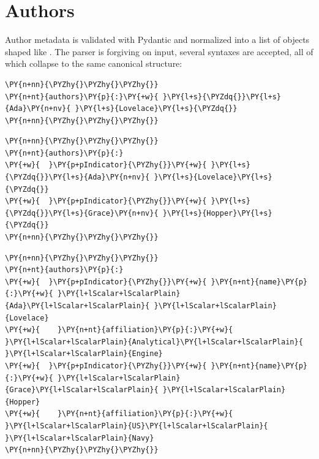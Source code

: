 \documentclass[a4paper,twoside]{article}
\begin{document}
\section{Authors}
Author metadata is validated with Pydantic and normalized into a list of objects shaped like . The parser is forgiving on input, several syntaxes are accepted, all of which collapse to the same canonical structure:
\begin{tscode}[lang=yaml, engine=pygments]
\begin{Verbatim}[commandchars=\\\{\},breaklines, breakanywhere, commandchars=\\\{\}]
\PY{n+nn}{\PYZhy{}\PYZhy{}\PYZhy{}}
\PY{n+nt}{authors}\PY{p}{:}\PY{+w}{ }\PY{l+s}{\PYZdq{}}\PY{l+s}{Ada}\PY{n+nv}{ }\PY{l+s}{Lovelace}\PY{l+s}{\PYZdq{}}
\PY{n+nn}{\PYZhy{}\PYZhy{}\PYZhy{}}
\end{Verbatim}
\end{tscode}
\begin{tscode}[lang=yaml, engine=pygments]
\begin{Verbatim}[commandchars=\\\{\},breaklines, breakanywhere, commandchars=\\\{\}]
\PY{n+nn}{\PYZhy{}\PYZhy{}\PYZhy{}}
\PY{n+nt}{authors}\PY{p}{:}
\PY{+w}{  }\PY{p+pIndicator}{\PYZhy{}}\PY{+w}{ }\PY{l+s}{\PYZdq{}}\PY{l+s}{Ada}\PY{n+nv}{ }\PY{l+s}{Lovelace}\PY{l+s}{\PYZdq{}}
\PY{+w}{  }\PY{p+pIndicator}{\PYZhy{}}\PY{+w}{ }\PY{l+s}{\PYZdq{}}\PY{l+s}{Grace}\PY{n+nv}{ }\PY{l+s}{Hopper}\PY{l+s}{\PYZdq{}}
\PY{n+nn}{\PYZhy{}\PYZhy{}\PYZhy{}}
\end{Verbatim}
\end{tscode}
\begin{tscode}[lang=yaml, engine=pygments]
\begin{Verbatim}[commandchars=\\\{\},breaklines, breakanywhere, commandchars=\\\{\}]
\PY{n+nn}{\PYZhy{}\PYZhy{}\PYZhy{}}
\PY{n+nt}{authors}\PY{p}{:}
\PY{+w}{  }\PY{p+pIndicator}{\PYZhy{}}\PY{+w}{ }\PY{n+nt}{name}\PY{p}{:}\PY{+w}{ }\PY{l+lScalar+lScalarPlain}{Ada}\PY{l+lScalar+lScalarPlain}{ }\PY{l+lScalar+lScalarPlain}{Lovelace}
\PY{+w}{    }\PY{n+nt}{affiliation}\PY{p}{:}\PY{+w}{ }\PY{l+lScalar+lScalarPlain}{Analytical}\PY{l+lScalar+lScalarPlain}{ }\PY{l+lScalar+lScalarPlain}{Engine}
\PY{+w}{  }\PY{p+pIndicator}{\PYZhy{}}\PY{+w}{ }\PY{n+nt}{name}\PY{p}{:}\PY{+w}{ }\PY{l+lScalar+lScalarPlain}{Grace}\PY{l+lScalar+lScalarPlain}{ }\PY{l+lScalar+lScalarPlain}{Hopper}
\PY{+w}{    }\PY{n+nt}{affiliation}\PY{p}{:}\PY{+w}{ }\PY{l+lScalar+lScalarPlain}{US}\PY{l+lScalar+lScalarPlain}{ }\PY{l+lScalar+lScalarPlain}{Navy}
\PY{n+nn}{\PYZhy{}\PYZhy{}\PYZhy{}}
\end{Verbatim}
\end{tscode}
\end{document}

